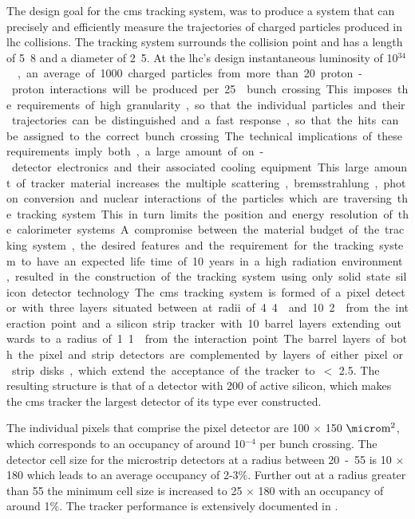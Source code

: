 The design goal for the \ac{cms} tracking system, was to produce a system that
can precisely and efficiently measure the trajectories of charged particles
produced in \ac{lhc} collisions. The tracking system surrounds the collision
point and has a length of \unit{5.8}{\meter} and a diameter of
\unit{2.5}{\meter}. At the \ac{lhc}'s design instantaneous luminosity of
\unit{10$^{34}$}{\lumiunits}, an average of 1000 charged particles from more
than 20 proton-proton interactions will be produced per \unit{25}{\nano\second}
bunch crossing. This imposes the requirements of high granularity, so that the
individual particles and their trajectories can be distinguished and a fast
response, so that the hits can be assigned to the correct bunch crossing. The
technical implications of these requirements imply both, a large amount of
on-detector electronics and their associated cooling equipment. This large
amount of tracker material increases the multiple scattering, bremsstrahlung,
photon conversion and nuclear interactions of the particles which are
traversing the tracking system. This in turn limits the position and energy
resolution of the calorimeter systems. A compromise between the material budget
of the tracking system, the desired features and the requirement for the
tracking system to have an expected life time of 10 years in a high radiation
environment, resulted in the construction of the tracking system using
only solid state silicon detector technology.

The \ac{cms} tracking system is formed of a pixel detector with three layers
situated between at radii of \unit{4.4}{\cm} and \unit{10.2}{\cm} from the interaction point
and a silicon strip tracker with 10 barrel layers extending outwards to a
radius of \unit{1.1}{\meter} from the interaction point. The barrel layers of
both the pixel and strip detectors are complemented by layers of either pixel
or strip disks, which extend the acceptance of the tracker to \mETA $<$ 2.5. The
resulting structure is that of a detector with \unit{200}{\squaremetre} of
active silicon, which makes the \ac{cms} tracker the largest detector of its
type ever constructed.

The individual pixels that comprise the pixel detector are 100 $\times$
150 $\micro\textrm{m}^{2}$, which corresponds to an occupancy of around
10$^{-4}$ per bunch crossing. The detector cell size for the microstrip
detectors at a radius between \unit{20-55}{\cm} is \unit{10}{\cm} $\times$
\unit{180}{\micro\meter} which leads to an average occupancy of 2-3$\%$.
Further out at a radius greater than \unit{55}{\cm}  the minimum cell size is
increased to \unit{25}{\cm} $\times$ \unit{180}{\micro\meter} with an occupancy
of around 1$\%$. The tracker performance is extensively documented in
.


